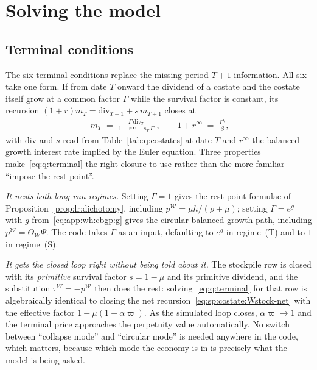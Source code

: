 \section{Solving the model}\label{sec:q:sol}

\subsection{Terminal conditions}\label{sec:q:sol:terminal}

The six terminal conditions replace the missing period-$T{+}1$ information. All six take one form. If from date $T$ onward the dividend of a costate and the costate itself grow at a common factor $\Gamma$ while the survival factor is constant, its recursion $\left(1+r\right)m_T=\mathrm{div}_{T+1}+s\,m_{T+1}$ closes at
\begin{align}
\boxed{\;m_T \;=\; \frac{\Gamma\,\mathrm{div}_T}{1+r^{\infty}-s_T\,\Gamma}\;},
\qquad
1+r^{\infty} \;=\; \frac{\Gamma^{\eta}}{\beta},
\label{eq:q:terminal}
\end{align}
with $\mathrm{div}$ and $s$ read from Table~\ref{tab:q:costates} at date $T$ and $r^{\infty}$ the balanced-growth interest rate implied by the Euler equation. Three properties make~\eqref{eq:q:terminal} the right closure to use rather than the more familiar ``impose the rest point''.

\emph{It nests both long-run regimes.} Setting $\Gamma=1$ gives the rest-point formulae of Proposition~\ref{prop:lr:dichotomy}, including $p^{\mathcal W}=\mu h/\left(\rho+\mu\right)$; setting $\Gamma=e^{g}$ with $g$ from~\eqref{eq:app:wh:cbgp:g} gives the circular balanced growth path, including $p^{\mathcal W}=\Theta_{\mathcal W}\Psi$. The code takes $\Gamma$ as an input, defaulting to $e^{g}$ in regime~(T) and to $1$ in regime~(S).

\emph{It gets the closed loop right without being told about it.} The stockpile row is closed with its \emph{primitive} survival factor $s=1-\mu$ and its primitive dividend, and the substitution $\tau^W=-p^{\mathcal W}$ then does the rest: solving~\eqref{eq:q:terminal} for that row is algebraically identical to closing the net recursion~\eqref{eq:sp:costate:Wstock-net} with the effective factor $1-\mu\left(1-\alpha\varpi\right)$. As the simulated loop closes, $\alpha\varpi\to1$ and the terminal price approaches the perpetuity value automatically. No switch between ``collapse mode'' and ``circular mode'' is needed anywhere in the code, which matters, because which mode the economy is in is precisely what the model is being asked.

